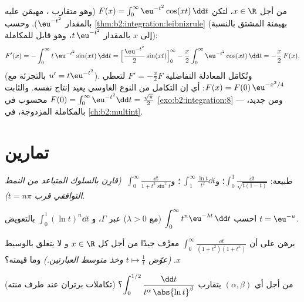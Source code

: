 \begin{example}\label{ex:b2:integration:laplace}
من أجل $x \in \R$، لتكن $F(x) = \int_0^{\infty} \eu^{-t^2}\cos(xt)\,\dd
t$ (وهو متقارب ، مهيمَن عليه بالمقدار $\eu^{-t^2}$). وحسب
\cref{thm:b2:integration:leibnizrule} (بهيمنة المشتق بالنسبة إلى
$x$ بالمقدار $t\,\eu^{-t^2}$، وهو قابل للمكاملة):
\[
F'(x) = -\int_0^\infty t\,\eu^{-t^2}\sin(xt)\,\dd t
= \Bigl[\frac{\eu^{-t^2}}{2}\sin(xt)\Bigr]_0^\infty
- \frac x2\int_0^\infty \eu^{-t^2}\cos(xt)\,\dd t
= -\frac x2\,F(x),
\]
(بالتجزئة مع $u' = t\eu^{-t^2}$). وتُكامَل المعادلة التفاضلية $F' =
-\frac x2 F$ لتعطي $F(x) = F(0)\,\eu^{-x^2/4}$: أي إن
التكامل من النوع الغاوسي يعيد إنتاج نفسه. والثابت $F(0) =
\int_0^\infty \eu^{-t^2}\dd t = \frac{\sqrt\pi}{2}$ محسوب في
\cref{exo:b2:integration:8} --- ومن جديد، بالمكاملة المزدوجة،
في \cref{ch:b2:multint}.
\end{example}

\section{تمارين}

\begin{exercise}[$\star$]\label{exo:b2:integration:1}
طبيعة:
$\displaystyle\int_0^1 \frac{\dd t}{\sqrt{t(1-t)}}$؛
و$\;\displaystyle\int_1^\infty \frac{\ln t}{t^2}\dd t$؛
و$\;\displaystyle\int_0^\infty \frac{\dd t}{1 + t^2\sin^2 t}$
\emph{(قارِن بالسلوك المتباعد من النمط التوافقي قرب $t =
n\pi$)}.
\end{exercise}

\begin{exercise}[$\star$]\label{exo:b2:integration:2}
احسب $\displaystyle\int_0^\infty t^n \eu^{-\lambda t}\,\dd t$
(مع $\lambda > 0$) عبر $\Gamma$، و
$\displaystyle\int_0^1 (\ln t)^n \dd t$ بالتعويض $t =
\eu^{-u}$.
\end{exercise}

\begin{exercise}[$\star$]\label{exo:b2:integration:3}
برهن على أن $\displaystyle\int_0^{\infty} \frac{\dd t}{(1 +
t^2)(1 + t^x)}$ معرَّف جيدًا من أجل كل $x \in \R$ و
لا يتعلق بالوسيط $x$. \emph{(عوّض $t \mapsto \frac1t$ وخذ
متوسط العبارتين.)} وما قيمته؟
\end{exercise}

\begin{exercise}[$\star\star$]\label{exo:b2:integration:4}
(تكاملات برتران عند طرف منته) من أجل أي $(\alpha,
\beta)$ يتقارب $\displaystyle\int_0^{1/2}
\frac{\dd t}{t^\alpha\,\abs{\ln t}^\beta}$؟
\end{exercise}

